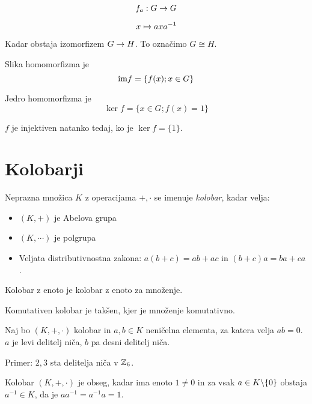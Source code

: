 
\[
	f_a : G \to G
\]

\[
	x \mapsto a x a^{-1}
\]


Kadar obstaja izomorfizem $G \to H$. To označimo $G \cong H$.


Slika homomorfizma je \[
	\text{im} f = \{f(x); x \in G\}
\]

Jedro homomorfizma je \[
	\ker f = \{x \in G; f(x) = 1\}
\]


$f$ je injektiven natanko tedaj, ko je $\ker f = \{1\}$.

\section{Kolobarji}


Neprazna množica $K$ z operacijama $+, \cdot$ se imenuje \textit{kolobar}, kadar velja:
\begin{itemize}
	\item $(K, +)$ je Abelova grupa
	\item $(K, \cdots)$ je polgrupa
	\item Veljata distributivnostna zakona: $a(b+c) = ab+ac$ in $(b+c)a = ba + ca$.
\end{itemize}


Kolobar z enoto je kolobar z enoto za množenje.

Komutativen kolobar je takšen, kjer je množenje komutativno.


Naj bo $(K, +, \cdot)$ kolobar in $a, b \in K$ neničelna elementa, za katera velja $ab = 0$. $a$ je levi delitelj niča, $b$ pa desni delitelj niča.

Primer: $2, 3$ sta delitelja niča v $\mathbb{Z}_6$.


Kolobar $(K, +, \cdot)$ je obseg, kadar ima enoto $1 \ne 0$ in za vsak $a \in K \backslash \{0\}$ obstaja $a^{-1} \in K$, da je $aa^{-1} = a^{-1}a = 1$.

